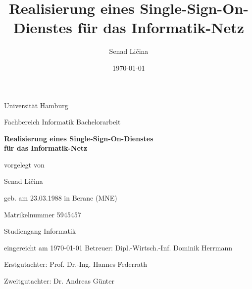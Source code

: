 \documentclass[12pt,a4paper,pointednumbers,abstracton]{scrartcl}
\title{Realisierung eines Single-Sign-On-Dienstes für das Informatik-Netz}
\author{Senad Ličina}
\date{\today}
\begin{document}

\thispagestyle{empty}
\begin{center}\Large
Universität Hamburg \par
Fachbereich Informatik
\vfill
Bachelorarbeit
\vfill
{\Large\textsf{\textbf{Realisierung eines Single-Sign-On-Dienstes\\ für das Informatik-Netz}}\par}
\vfill
vorgelegt von 
\par\bigskip
Senad Ličina \par
geb. am 23.03.1988 in Berane (MNE) \par
Matrikelnummer 5945457 \par
Studiengang Informatik \par
\vfill
eingereicht am \today
\vfill 
Betreuer: Dipl.-Wirtsch.-Inf. Dominik Herrmann \par
Erstgutachter: Prof. Dr.-Ing. Hannes Federrath \par
Zweitgutachter: Dr. Andreas Günter
\end{center}
\end{document}
